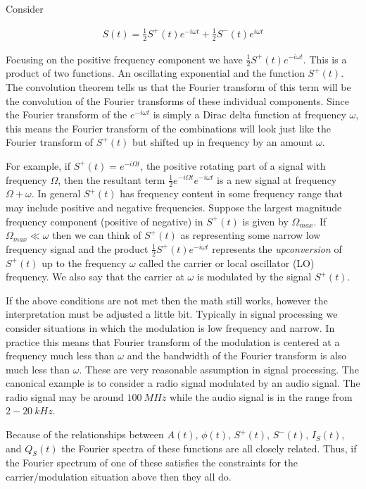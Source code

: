 \documentclass[12pt]{article}
\begin{document}
Consider

\begin{align}
S(t) = \frac{1}{2}S^+(t) e^{-i\omega t} + \frac{1}{2}S^-(t)e^{i\omega t}
\end{align}

Focusing on the positive frequency component we have $\frac{1}{2}S^+(t)e^{-i\omega t}$. This is a product of two functions. An oscillating exponential and the function $S^+(t)$. The convolution theorem tells us that the Fourier transform of this term will be the convolution of the Fourier transforms of these individual components. Since the Fourier transform of the $e^{-i\omega t}$ is simply a Dirac delta function at frequency $\omega$, this means the Fourier transform of the combinations will look just like the Fourier transform of $S^+(t)$ but shifted up in frequency by an amount $\omega$. 

For example, if $S^+(t) = e^{-i\Omega t}$, the positive rotating part of a signal with frequency $\Omega$, then the resultant term $\frac{1}{2}e^{-i\Omega t}e^{-i\omega t}$ is a new signal at frequency $\Omega + \omega$. In general $S^+(t)$ has frequency content in some frequency range that may include positive and negative frequencies. Suppose the largest magnitude frequency component (positive of negative) in $S^+(t)$ is given by $\Omega_{max}$. If $\Omega_{max} \ll \omega$ then we can think of $S^+(t)$ as representing some narrow low frequency signal and the product $\frac{1}{2}S^+(t)e^{-i\omega t}$ represents the \textit{upconversion} of $S^+(t)$ up to the frequency $\omega$ called the carrier or local oscillator (LO) frequency. We also say that the carrier at $\omega$ is modulated by the signal $S^+(t)$.

If the above conditions are not met then the math still works, however the interpretation must be adjusted a little bit. Typically in signal processing we consider situations in which the modulation is low frequency and narrow. In practice this means that Fourier transform of the modulation is centered at a frequency much less than $\omega$ and the bandwidth of the Fourier transform is also much less than $\omega$. These are very reasonable assumption in signal processing. The canonical example is to consider a radio signal modulated by an audio signal. The radio signal may be around $\SI{100}{MHz}$ while the audio signal is in the range from $2-\SI{20}{kHz}$.

Because of the relationships between $A(t)$, $\phi(t)$, $S^+(t)$, $S^-(t)$, $I_S(t)$, and $Q_S(t)$ the Fourier spectra of these functions are all closely related. Thus, if the Fourier spectrum of one of these satisfies the constraints for the carrier/modulation situation above then they all do.
\end{document}
